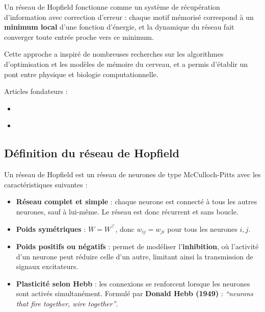 \documentclass[12pt, letterpaper]{article}
\begin{document}
\begin{tcolorbox}[title=Idée clé]
	Un réseau de Hopfield fonctionne comme un système de récupération d’information avec correction d’erreur : chaque motif mémorisé correspond à un \textbf{minimum local} d'une fonction d’énergie, et la dynamique du réseau fait converger toute entrée proche vers ce minimum.
\end{tcolorbox}

\noindent Cette approche a inspiré de nombreuses recherches sur les algorithmes d'optimisation et les modèles de mémoire du cerveau, et a permis d’établir un pont entre physique et biologie computationnelle.

\bigskip

\noindent Articles fondateurs :
\begin{itemize}
	\item {}~\cite{hopfield1982neural}
	\item {}~\cite{hopfield1984neurons}
\end{itemize}

\subsection{Définition du réseau de Hopfield}

\noindent Un réseau de Hopfield est un réseau de neurones de type McCulloch-Pitts avec les caractéristiques suivantes :
\begin{itemize}
	\item \textbf{Réseau complet et simple} : chaque neurone est connecté à tous les autres neurones, sauf à lui-même. Le réseau est donc récurrent et sans boucle.
	\item \textbf{Poids symétriques} : $W = W^\top$, donc $w_{ij} = w_{ji}$ pour tous les neurones $i,j$.
	\item \textbf{Poids positifs ou négatifs} : permet de modéliser l'\textbf{inhibition}, où l'activité d’un neurone peut réduire celle d’un autre, limitant ainsi la transmission de signaux excitateurs.
	\item \textbf{Plasticité selon Hebb} : les connexions se renforcent lorsque les neurones sont activés simultanément.
	      Formulé par \textbf{Donald Hebb (1949)} : \textit{“neurons that fire together, wire together”}.
\end{itemize}
\end{document}
